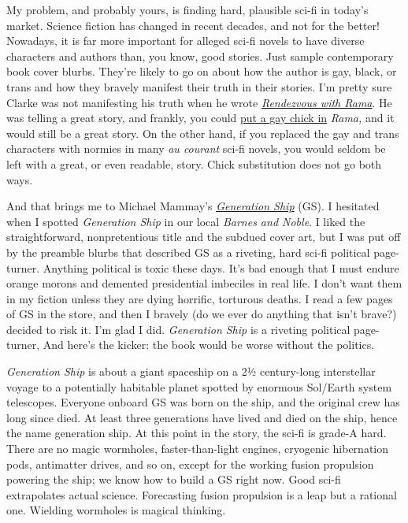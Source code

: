 My problem, and probably yours, is finding hard, plausible sci-fi in
today's market. Science fiction has changed in recent decades, and not
for the better! Nowadays, it is far more important for alleged sci-fi
novels to have diverse characters and authors than, you know, good
stories. Just sample contemporary book cover blurbs. They're likely to
go on about how the author is gay, black, or trans and how they bravely
manifest their truth in their stories. I'm pretty sure Clarke was not
manifesting his truth when he wrote
\href{https://www.amazon.com/Rendezvous-Rama-Arthur-C-Clarke/dp/0553287893}{\emph{Rendezvous
with Rama}}. He was telling a great story, and frankly, you could
\href{https://www.youtube.com/watch?v=9vJDcCcANnU}{put a gay chick in}
\emph{Rama,} and it would still be a great story. On the other hand, if
you replaced the gay and trans characters with normies in many \emph{au
courant} sci-fi novels, you would seldom be left with a great, or even
readable, story. Chick substitution does not go both ways.

And that brings me to Michael Mammay's
\href{https://www.goodreads.com/book/show/63876699-generation-ship}{\emph{Generation
Ship}} (GS). I hesitated when I spotted \emph{Generation Ship} in our
local \emph{Barnes and Noble}. I liked the straightforward,
nonpretentious title and the subdued cover art, but I was put off by the
preamble blurbs that described GS as a riveting, hard sci-fi political
page-turner. Anything political is toxic these days. It's bad enough
that I must endure orange morons and demented presidential imbeciles in
real life. I don't want them in my fiction unless they are dying
horrific, torturous deaths. I read a few pages of GS in the store, and
then I bravely (do we ever do anything that isn't brave?) decided to
risk it. I'm glad I did. \emph{Generation Ship} is a riveting
political page-turner, And here's the kicker: the book would be worse
without the politics.

\emph{Generation Ship} is about a giant spaceship on a 2½ century-long
interstellar voyage to a potentially habitable planet spotted by
enormous Sol/Earth system telescopes. Everyone onboard GS was born on
the ship, and the original crew has long since died. At least three
generations have lived and died on the ship, hence the name generation
ship. At this point in the story, the sci-fi is grade-A hard. There are
no magic wormholes, faster-than-light engines, cryogenic hibernation
pods, antimatter drives, and so on, except for the working fusion
propulsion powering the ship; we know how to build a GS right now. Good
sci-fi extrapolates actual science. Forecasting fusion propulsion is a
leap but a rational one. Wielding wormholes is magical thinking.

